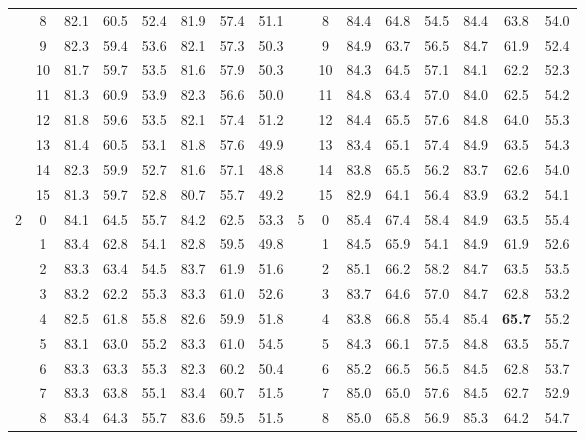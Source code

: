 \begin{table}[p]
{\begin{tabular}{c c | c c c | c c c || c c | c c c | c c c}
             & 8 & 82.1 & 60.5 & 52.4 & 81.9 & 57.4 & 51.1 &  & 8 & 84.4 & 64.8 & 54.5 & 84.4 & 63.8 & 54.0 \\
             & 9 & 82.3 & 59.4 & 53.6 & 82.1 & 57.3 & 50.3 &  & 9 & 84.9 & 63.7 & 56.5 & 84.7 & 61.9 & 52.4 \\
             & 10 & 81.7 & 59.7 & 53.5 & 81.6 & 57.9 & 50.3 &  & 10 & 84.3 & 64.5 & 57.1 & 84.1 & 62.2 & 52.3 \\
             & 11 & 81.3 & 60.9 & 53.9 & 82.3 & 56.6 & 50.0 &  & 11 & 84.8 & 63.4 & 57.0 & 84.0 & 62.5 & 54.2 \\
             & 12 & 81.8 & 59.6 & 53.5 & 82.1 & 57.4 & 51.2 &  & 12 & 84.4 & 65.5 & 57.6 & 84.8 & 64.0 & 55.3 \\
             & 13 & 81.4 & 60.5 & 53.1 & 81.8 & 57.6 & 49.9 &  & 13 & 83.4 & 65.1 & 57.4 & 84.9 & 63.5 & 54.3 \\
             & 14 & 82.3 & 59.9 & 52.7 & 81.6 & 57.1 & 48.8 &  & 14 & 83.8 & 65.5 & 56.2 & 83.7 & 62.6 & 54.0 \\
             & 15 & 81.3 & 59.7 & 52.8 & 80.7 & 55.7 & 49.2 &  & 15 & 82.9 & 64.1 & 56.4 & 83.9 & 63.2 & 54.1 \\
            \midrule
            \multirow{16}{*}{2} & 0 & 84.1 & 64.5 & 55.7 & 84.2 & 62.5 & 53.3 & \multirow{16}{*}{5} & 0 & 85.4 & 67.4 & 58.4 & 84.9 & 63.5 & 55.4 \\
             & 1 & 83.4 & 62.8 & 54.1 & 82.8 & 59.5 & 49.8 &  & 1 & 84.5 & 65.9 & 54.1 & 84.9 & 61.9 & 52.6 \\
             & 2 & 83.3 & 63.4 & 54.5 & 83.7 & 61.9 & 51.6 &  & 2 & 85.1 & 66.2 & 58.2 & 84.7 & 63.5 & 53.5 \\
             & 3 & 83.2 & 62.2 & 55.3 & 83.3 & 61.0 & 52.6 &  & 3 & 83.7 & 64.6 & 57.0 & 84.7 & 62.8 & 53.2 \\
             & 4 & 82.5 & 61.8 & 55.8 & 82.6 & 59.9 & 51.8 &  & 4 & 83.8 & 66.8 & 55.4 & 85.4 & \textbf{65.7} & 55.2 \\
             & 5 & 83.1 & 63.0 & 55.2 & 83.3 & 61.0 & 54.5 &  & 5 & 84.3 & 66.1 & 57.5 & 84.8 & 63.5 & 55.7 \\
             & 6 & 83.3 & 63.3 & 55.3 & 82.3 & 60.2 & 50.4 &  & 6 & 85.2 & 66.5 & 56.5 & 84.5 & 62.8 & 53.7 \\
             & 7 & 83.3 & 63.8 & 55.1 & 83.4 & 60.7 & 51.5 &  & 7 & 85.0 & 65.0 & 57.6 & 84.5 & 62.7 & 52.9 \\
             & 8 & 83.4 & 64.3 & 55.7 & 83.6 & 59.5 & 51.5 &  & 8 & 85.0 & 65.8 & 56.9 & 85.3 & 64.2 & 54.7 \\

\end{tabular}}
\end{table}
